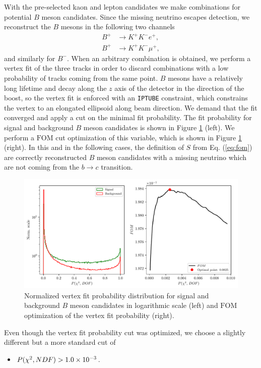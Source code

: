 With the pre-selected kaon and lepton candidates we make combinations for potential $B$ meson candidates. Since the missing neutrino escapes detection, we reconstruct the $B$ mesons in the following two channels
\begin{align*}
B^+ &\to K^+ K^- e^+, \\
B^+ &\to K^+ K^- \mu^+,
\end{align*}
and similarly for $B^-$. When an arbitrary combination is obtained, we perform a vertex fit of the three tracks in order to discard combinations with a low probability of tracks coming from the same point. $B$ mesons have a relatively long lifetime and decay along the $z$ axis of the detector in the direction of the boost, so the vertex fit is enforced with an \texttt{IPTUBE} constraint, which constrains the vertex to an elongated ellipsoid along beam direction. We demand that the fit converged and apply a cut on the minimal fit probability. The fit probability for signal and background $B$ meson candidates is shown in Figure \ref{fig:vtx} (left). We perform a $\mathrm{FOM}$ cut optimization of this variable, which is shown in Figure \ref{fig:vtx} (right). In this and in the following cases, the definition of $S$ from Eq. (\ref{eq:fom}) are correctly reconstructed $B$ meson candidates with a missing neutrino which are not coming from the $b \to c$ transition.

\begin{figure}[H]
\centering
\captionsetup{width=0.8\linewidth}
\includegraphics[width=\linewidth]{fig/VTX}
\caption{Normalized vertex fit probability distribution for signal and background $B$ meson candidates in logarithmic scale (left) and $\mathrm{FOM}$ optimization of the vertex fit probability (right).}
\label{fig:vtx}
\end{figure}

Even though the vertex fit probability cut was optimized, we choose a slightly different but a more standard cut of
\begin{itemize}
\item $P(\chi^2,NDF) > 1.0\times 10^{-3}$.
\end{itemize}

